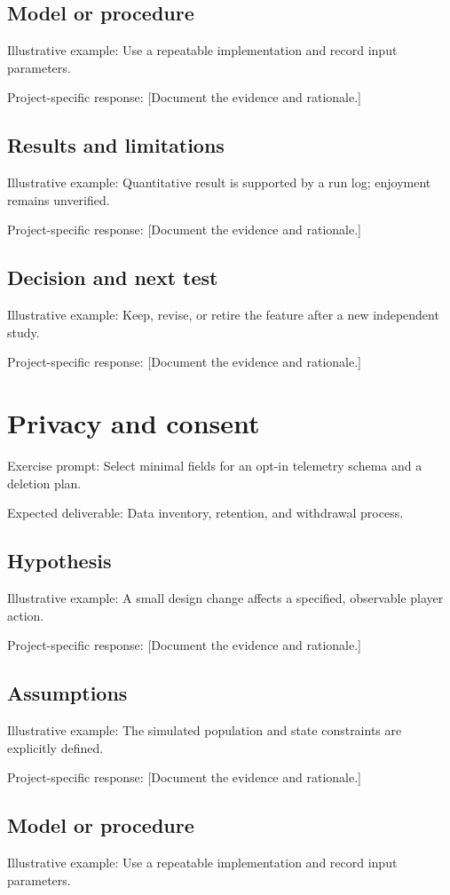 \documentclass[11pt]{article}
\begin{document}
\subsection{Model or procedure}
Illustrative example: Use a repeatable implementation and record input parameters.

Project-specific response: [Document the evidence and rationale.]


\subsection{Results and limitations}
Illustrative example: Quantitative result is supported by a run log; enjoyment remains unverified.

Project-specific response: [Document the evidence and rationale.]


\subsection{Decision and next test}
Illustrative example: Keep, revise, or retire the feature after a new independent study.

Project-specific response: [Document the evidence and rationale.]


\section{Privacy and consent}
Exercise prompt: Select minimal fields for an opt-in telemetry schema and a deletion plan.

Expected deliverable: Data inventory, retention, and withdrawal process.


\subsection{Hypothesis}
Illustrative example: A small design change affects a specified, observable player action.

Project-specific response: [Document the evidence and rationale.]


\subsection{Assumptions}
Illustrative example: The simulated population and state constraints are explicitly defined.

Project-specific response: [Document the evidence and rationale.]


\subsection{Model or procedure}
Illustrative example: Use a repeatable implementation and record input parameters.
\end{document}
